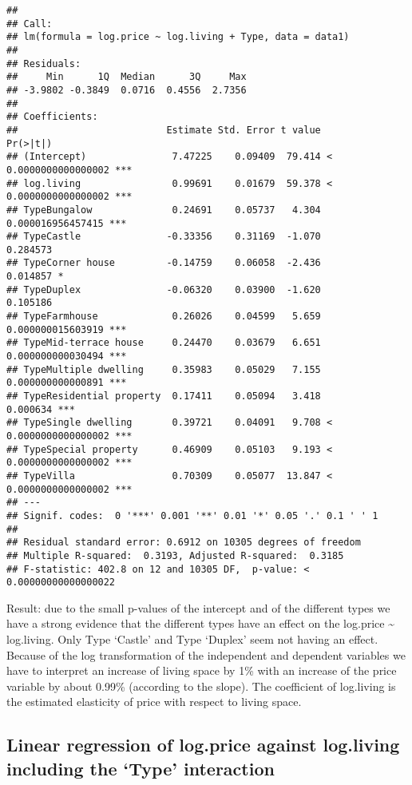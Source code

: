 \documentclass[
]{article}
\begin{document}
\begin{verbatim}
## 
## Call:
## lm(formula = log.price ~ log.living + Type, data = data1)
## 
## Residuals:
##     Min      1Q  Median      3Q     Max 
## -3.9802 -0.3849  0.0716  0.4556  2.7356 
## 
## Coefficients:
##                          Estimate Std. Error t value             Pr(>|t|)    
## (Intercept)               7.47225    0.09409  79.414 < 0.0000000000000002 ***
## log.living                0.99691    0.01679  59.378 < 0.0000000000000002 ***
## TypeBungalow              0.24691    0.05737   4.304    0.000016956457415 ***
## TypeCastle               -0.33356    0.31169  -1.070             0.284573    
## TypeCorner house         -0.14759    0.06058  -2.436             0.014857 *  
## TypeDuplex               -0.06320    0.03900  -1.620             0.105186    
## TypeFarmhouse             0.26026    0.04599   5.659    0.000000015603919 ***
## TypeMid-terrace house     0.24470    0.03679   6.651    0.000000000030494 ***
## TypeMultiple dwelling     0.35983    0.05029   7.155    0.000000000000891 ***
## TypeResidential property  0.17411    0.05094   3.418             0.000634 ***
## TypeSingle dwelling       0.39721    0.04091   9.708 < 0.0000000000000002 ***
## TypeSpecial property      0.46909    0.05103   9.193 < 0.0000000000000002 ***
## TypeVilla                 0.70309    0.05077  13.847 < 0.0000000000000002 ***
## ---
## Signif. codes:  0 '***' 0.001 '**' 0.01 '*' 0.05 '.' 0.1 ' ' 1
## 
## Residual standard error: 0.6912 on 10305 degrees of freedom
## Multiple R-squared:  0.3193, Adjusted R-squared:  0.3185 
## F-statistic: 402.8 on 12 and 10305 DF,  p-value: < 0.00000000000000022
\end{verbatim}

Result: due to the small p-values of the intercept and of the different
types we have a strong evidence that the different types have an effect
on the log.price \textasciitilde{} log.living. Only Type `Castle' and
Type `Duplex' seem not having an effect. Because of the log
transformation of the independent and dependent variables we have to
interpret an increase of living space by 1\% with an increase of the
price variable by about 0.99\% (according to the slope). The coefficient
of log.living is the estimated elasticity of price with respect to
living space.

\hypertarget{linear-regression-of-log.price-against-log.living-including-the-type-interaction}{%
\subsection{Linear regression of log.price against log.living including
the `Type'
interaction}\label{linear-regression-of-log.price-against-log.living-including-the-type-interaction}}
\end{document}
